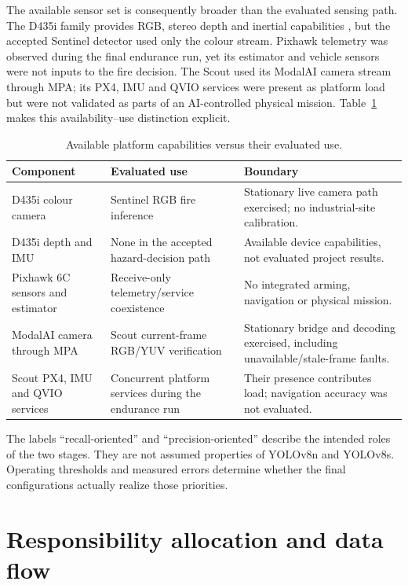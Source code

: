 The available sensor set is consequently broader than the evaluated sensing
path. The D435i family provides RGB, stereo depth and inertial capabilities
\cite{IntelD400Datasheet}, but the accepted Sentinel detector used only the
colour stream. Pixhawk telemetry was observed during the final endurance run,
yet its estimator and vehicle sensors were not inputs to the fire decision.
The Scout used its ModalAI camera stream through MPA; its PX4, IMU and QVIO
services were present as platform load but were not validated as parts of an
AI-controlled physical mission. Table~\ref{tab:sensor-use-boundary} makes this
availability--use distinction explicit.

\begin{table}[H]
  \centering
  \caption{Available platform capabilities versus their evaluated use.}
  \label{tab:sensor-use-boundary}
  \scriptsize
  \begin{tabularx}{\textwidth}{@{}p{}p{}X@{}}
    \toprule
    Component & Evaluated use & Boundary \\
    \midrule
    D435i colour camera & Sentinel RGB fire inference & Stationary live camera
    path exercised; no industrial-site calibration. \\
    D435i depth and IMU & None in the accepted hazard-decision path & Available
    device capabilities, not evaluated project results. \\
    Pixhawk 6C sensors and estimator & Receive-only telemetry/service
    coexistence & No integrated arming, navigation or physical mission. \\
    ModalAI camera through MPA & Scout current-frame RGB/YUV verification &
    Stationary bridge and decoding exercised, including unavailable/stale-frame
    faults. \\
    Scout PX4, IMU and QVIO services & Concurrent platform services during the
    endurance run & Their presence contributes load; navigation accuracy was
    not evaluated. \\
    \bottomrule
  \end{tabularx}
\end{table}

The labels ``recall-oriented'' and ``precision-oriented'' describe the intended
roles of the two stages. They are not assumed properties of YOLOv8n and
YOLOv8s. Operating thresholds and measured errors determine whether the final
configurations actually realize those priorities.

\section{Responsibility allocation and data flow}
\label{sec:architecture:dataflow}

